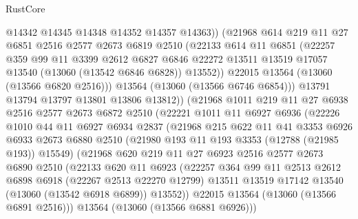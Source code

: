 \begin{lexlean}{RustCore}
\begin{coremodule}
                @14342
                @14345
                @14348
                @14352
                @14357
                @14363))
            (@21968
              @614
              @219
              @11
              @27
              @6851
              @2516
              @2577
              @2673
              @6819
              @2510
              (@22133
                @614
                @11
                @6851
                (@22257
                  @359
                  @99
                  @11
                  @3399
                  @2612
                  @6827
                  @6846
                  @22272
                  @13511
                  @13519
                  @17057
                  @13540
                  (@13060 (@13542 @6846 @6828))
                  @13552))
              @22015
              @13564
              (@13060 (@13566 @6820 @2516)))
            @13564
            (@13060 (@13566 @6746 @6854)))
          @13791
          @13794
          @13797
          @13801
          @13806
          @13812))
      (@21968
        @1011
        @219
        @11
        @27
        @6938
        @2516
        @2577
        @2673
        @6872
        @2510
        (@22221
          @1011
          @11
          @6927
          @6936
          (@22226
            @1010
            @44
            @11
            @6927
            @6934
            @2837
            (@21968
              @215
              @622
              @11
              @41
              @3353
              @6926
              @6933
              @2673
              @6880
              @2510
              (@21980 @193 @11 @193 @3353 (@12788 (@21985 @193)) @15549)
              (@21968
                @620
                @219
                @11
                @27
                @6923
                @2516
                @2577
                @2673
                @6890
                @2510
                (@22133
                  @620
                  @11
                  @6923
                  (@22257
                    @364
                    @99
                    @11
                    @2513
                    @2612
                    @6898
                    @6918
                    (@22267 @2513 @22270 @12799)
                    @13511
                    @13519
                    @17142
                    @13540
                    (@13060 (@13542 @6918 @6899))
                    @13552))
                @22015
                @13564
                (@13060 (@13566 @6891 @2516)))
              @13564
              (@13060 (@13566 @6881 @6926)))

\end{coremodule}
\end{lexlean}
